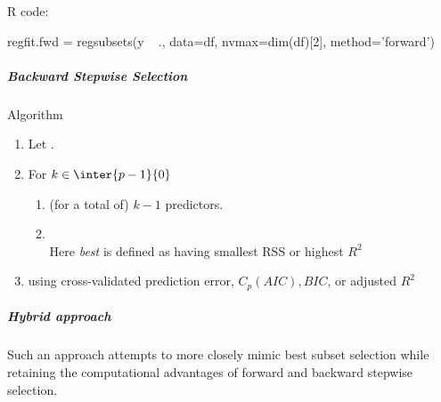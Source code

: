 R code:
\begin{rcode}[deletekeywords={df, summary}]
regfit.fwd = regsubsets(y ~ ., data=df, nvmax=dim(df)[2], method='forward')
\end{rcode}

\subparagraph{Backward Stepwise Selection}
Algorithm
\begin{enumerate}
	\item Let .
	\item For $k\in\inter{p-1}{0}$
		\begin{enumerate}[label=\alph*]
			\item {} (for a total of)
				$k-1$ predictors.
			\item {}\\
				Here \emph{best} is defined as having
				smallest RSS or highest $R^{2}$
			\end{enumerate}
	\item {} using cross-validated
		prediction error, $C_{p}(AIC), BIC$, or adjusted
		$R^{2}$
\end{enumerate}

\subparagraph{Hybrid approach}
Such an approach attempts to more closely mimic best subset selection
while retaining the computational advantages of forward and backward
stepwise selection.

